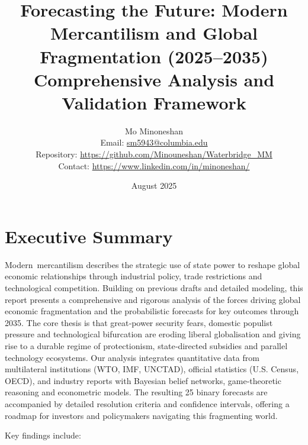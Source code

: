 \documentclass{article}
\title{\textbf{Forecasting the Future: Modern Mercantilism and Global Fragmentation (2025--2035)}\\\Large Comprehensive Analysis and Validation Framework}
\author{Mo Minoneshan\\
\small Email: \href{mailto:sm5943@columbia.edu}{sm5943@columbia.edu}\\
\small Repository: \url{https://github.com/Minouneshan/Waterbridge\_MM}\\
\small Contact: \url{https://www.linkedin.com/in/minoneshan/}}
\date{August 2025}
\begin{document}
\maketitle

\tableofcontents

\clearpage

\section{Executive Summary}

Modern mercantilism describes the strategic use of state power to reshape global economic relationships through industrial policy, trade restrictions and technological competition.  Building on previous drafts and detailed modeling, this report presents a comprehensive and rigorous analysis of the forces driving global economic fragmentation and the probabilistic forecasts for key outcomes through 2035.  The core thesis is that great‑power security fears, domestic populist pressure and technological bifurcation are eroding liberal globalisation and giving rise to a durable regime of protectionism, state‑directed subsidies and parallel technology ecosystems.  Our analysis integrates quantitative data from multilateral institutions (WTO, IMF, UNCTAD), official statistics (U.S. Census, OECD), and industry reports with Bayesian belief networks, game‑theoretic reasoning and econometric models.  The resulting 25 binary forecasts are accompanied by detailed resolution criteria and confidence intervals, offering a roadmap for investors and policymakers navigating this fragmenting world.

Key findings include:
\end{document}
